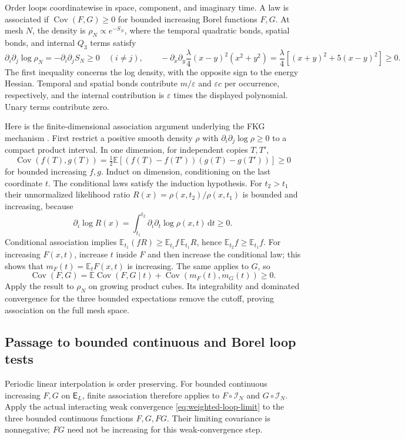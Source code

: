 \documentclass[11pt]{article}
\numberwithin{equation}{section}
\theoremstyle{definition}
\newcommand{\E}{\mathbb E}
\newcommand{\dd}{\,\mathrm d}
\newcommand{\eps}{\varepsilon}
\begin{document}
Order loops coordinatewise in space, component, and imaginary time.  A law is
associated if $\operatorname{Cov}(F,G)\geq0$ for bounded increasing Borel
functions $F,G$.  At mesh $N$, the density is $\rho_N\propto e^{-S_N}$, where
the temporal quadratic bonds, spatial bonds, and internal $Q_3$ terms satisfy
\begin{equation}
 \partial_i\partial_j\log\rho_N
 =-\partial_i\partial_j S_N\geq0\quad(i\neq j),\qquad
 -\partial_x\partial_y\frac\lambda4(x-y)^2(x^2+y^2)
 =\frac\lambda4[(x+y)^2+5(x-y)^2]\geq0. \label{eq:log-supermodular}
\end{equation}
The first inequality concerns the log density, with the opposite sign to
the energy Hessian.  Temporal and spatial bonds contribute $m/\eps$ and
$\eps c$ per occurrence, respectively, and the internal contribution is
$\eps$ times the displayed polynomial.  Unary terms contribute zero.

Here is the finite-dimensional association argument underlying the FKG
mechanism \cite{FKG}.  First restrict a positive smooth density $\rho$
with $\partial_i\partial_j\log\rho\geq0$ to a compact product interval.
In one dimension, for independent copies $T,T'$,
\[
 \operatorname{Cov}(f(T),g(T))
 =\tfrac12\E[(f(T)-f(T'))(g(T)-g(T'))]\geq0
\]
for bounded increasing $f,g$.  Induct on dimension, conditioning on the
last coordinate $t$.  The conditional laws satisfy the induction
hypothesis.  For $t_2>t_1$ their unnormalized likelihood ratio
$R(x)=\rho(x,t_2)/\rho(x,t_1)$ is bounded and increasing, because
\[
 \partial_i\log R(x)
 =\int_{t_1}^{t_2}\partial_i\partial_t\log\rho(x,t)\dd t\geq0.
\]
Conditional association implies
$\E_{t_1}(fR)\geq\E_{t_1}f\,\E_{t_1}R$, hence
$\E_{t_2}f\geq\E_{t_1}f$.  For increasing $F(x,t)$, increase $t$
inside $F$ and then increase the conditional law; this shows that
$m_F(t)=\E_tF(x,t)$ is increasing.  The same applies to $G$, so
\[
 \operatorname{Cov}(F,G)
 =\E\operatorname{Cov}(F,G\mid t)+\operatorname{Cov}(m_F(t),m_G(t))
 \geq0.
\]
Apply the result to $\rho_N$ on growing product cubes.  Its integrability
and dominated convergence for the three bounded expectations remove the
cutoff, proving association on the full mesh space.

\subsection{Passage to bounded continuous and Borel loop tests}
\label{sec:fkg-loop-passage}

Periodic linear interpolation is order preserving.  For bounded continuous
increasing $F,G$ on $\mathsf E_L$, finite association therefore applies to
$F\circ\mathcal I_N$ and $G\circ\mathcal I_N$.  Apply the actual interacting
weak convergence \eqref{eq:weighted-loop-limit} to the three bounded
continuous functions $F,G,FG$.  Their limiting covariance is nonnegative;
$FG$ need not be increasing for this weak-convergence step.
\end{document}
